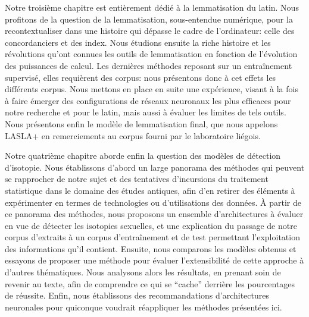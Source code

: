 Notre troisième chapitre est entièrement dédié à la lemmatisation du latin. Nous profitons de la question de la lemmatisation, sous-entendue numérique, pour la recontextualiser dans une histoire qui dépasse le cadre de l'ordinateur: celle des concordanciers et des index. Nous étudions ensuite la riche histoire et les révolutions qu'ont connues les outils de lemmatisation en fonction de l'évolution des puissances de calcul. Les dernières méthodes reposant sur un entraînement supervisé, elles requièrent des corpus: nous présentons donc à cet effets les différents corpus. Nous mettons en place en suite une expérience, visant à la fois à faire émerger des configurations de réseaux neuronaux les plus efficaces pour notre recherche et pour le latin, mais aussi à évaluer les limites de tels outils. Nous présentons enfin le modèle de lemmatisation final, que nous appelons LASLA+ en remerciements au corpus fourni par le laboratoire liégois.

Notre quatrième chapitre aborde enfin la question des modèles de détection d'isotopie. Nous établissons d'abord un large panorama des méthodes qui peuvent se rapprocher de notre sujet et des tentatives d'incursions du traitement statistique dans le domaine des études antiques, afin d'en retirer des éléments à expérimenter en termes de technologies ou d'utilisations des données. À partir de ce panorama des méthodes, nous proposons un ensemble d'architectures à évaluer en vue de détecter les isotopies sexuelles, et une explication du passage de notre corpus d'extraits à un corpus d'entraînement et de test permettant l'exploitation des informations qu'il contient. Ensuite, nous comparons les modèles obtenus et essayons de proposer une méthode pour évaluer l'extensibilité de cette approche à d'autres thématiques. Nous analysons alors les résultats, en prenant soin de revenir au texte, afin de comprendre ce qui se \enquote{cache} derrière les pourcentages de réussite. Enfin, nous établissons des recommandations d'architectures neuronales pour quiconque voudrait réappliquer les méthodes présentées ici.


% 

